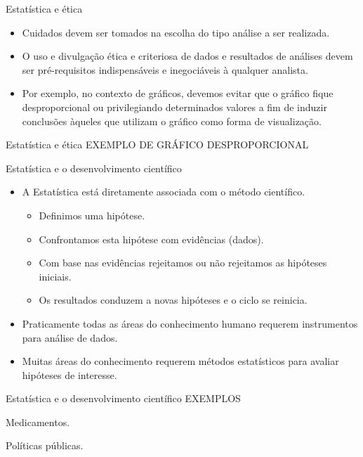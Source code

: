 \documentclass[
  ignorenonframetext,
  serif,
  professionalfont,
  usenames,
  dvipsnames,
  aspectratio = 169]{beamer}
\providecommand{\tightlist}{%
  \setlength{\itemsep}{0pt}\setlength{\parskip}{0pt}}
\renewcommand{\tightlist}{%
  \setlength{\itemsep}{0\baselineskip}
  \setlength{\parskip}{0.25\baselineskip}
}
\begin{document}
\begin{frame}{Estatística e ética}
\protect\hypertarget{estatuxedstica-e-uxe9tica}{}
\begin{itemize}
\item
  Cuidados devem ser tomados na escolha do tipo análise a ser realizada.
\item
  O uso e divulgação ética e criteriosa de dados e resultados de
  análises devem ser pré-requisitos indispensáveis e inegociáveis à
  qualquer analista.
\item
  Por exemplo, no contexto de gráficos, devemos evitar que o gráfico
  fique desproporcional ou privilegiando determinados valores a fim de
  induzir conclusões àqueles que utilizam o gráfico como forma de
  visualização.
\end{itemize}
\end{frame}

\begin{frame}{Estatística e ética}
\protect\hypertarget{estatuxedstica-e-uxe9tica-1}{}
EXEMPLO DE GRÁFICO DESPROPORCIONAL
\end{frame}

\begin{frame}{Estatística e o desenvolvimento científico}
\protect\hypertarget{estatuxedstica-e-o-desenvolvimento-cientuxedfico}{}
\begin{itemize}
\item
  A Estatística está diretamente associada com o método científico.

  \begin{itemize}
  \tightlist
  \item
    Definimos uma hipótese.
  \item
    Confrontamos esta hipótese com evidências (dados).
  \item
    Com base nas evidências rejeitamos ou não rejeitamos as hipóteses
    iniciais.
  \item
    Os resultados conduzem a novas hipóteses e o ciclo se reinicia.
  \end{itemize}
\item
  Praticamente todas as áreas do conhecimento humano requerem
  instrumentos para análise de dados.
\item
  Muitas áreas do conhecimento requerem métodos estatísticos para
  avaliar hipóteses de interesse.
\end{itemize}
\end{frame}

\begin{frame}{Estatística e o desenvolvimento científico}
\protect\hypertarget{estatuxedstica-e-o-desenvolvimento-cientuxedfico-1}{}
EXEMPLOS

Medicamentos.

Políticas públicas.
\end{frame}
\end{document}
